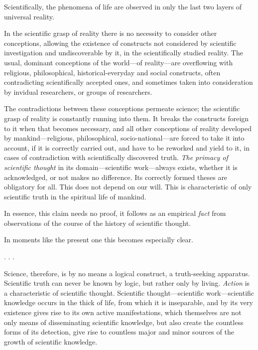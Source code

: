 Scientifically, the phenomena of life are observed in only the last two layers
of universal reality.

In the scientific grasp of reality there is no necessity to consider other
conceptions, allowing the existence of constructs not considered by scientific
investigation and undiscoverable by it, in the scientifically studied reality.
The usual, dominant conceptions of the world---of reality---are overflowing
with religious, philosophical, historical-everyday and social constructs, often
contradicting scientifically accepted ones, and sometimes taken into
consideration by invidual researchers, or groups of researchers.

The contradictions between these conceptions permeate science; the scientific
grasp of reality is constantly running into them.  It breaks the constructs
foreign to it when that becomes necessary, and all other conceptions of reality
developed by mankind---religious, philosophical, socio-national---are forced to
take it into account, if it is correctly carried out, and have to be reworked
and yield to it, in cases of contradiction with scientifically discovered
truth.  \emph{The primacy of scientific thought} in its domain---scientific
work---always exists, whether it is acknowledged, or not makes no difference.
Its correctly formed theses are obligatory for all.  This does not depend on
our will.  This is characteristic of only scientific truth in the spiritual
life of mankind.

In essence, this claim needs no proof, it follows as an empirical \emph{fact}
from observations of the course of the history of scientific thought.

In moments like the present one this becomes especially clear.


\Section %

. . .

\Section %
Science, therefore, is by no means a logical construct, a truth-seeking
apparatus.  Scientific truth can never be known by logic, but rather only by
living.  \emph{Action }is a characteristic of scientific thought.  Scientific
thought---scientific work---scientific knowledge occurs in the thick of life,
from which it is inseparable, and by its very existence gives rise to its own
active manifestations, which themselves are not only means of disseminating
scientific knowledge, but also create the countless forms of its detection,
give rise to countless major and minor sources of the growth of scientific
knowledge.

